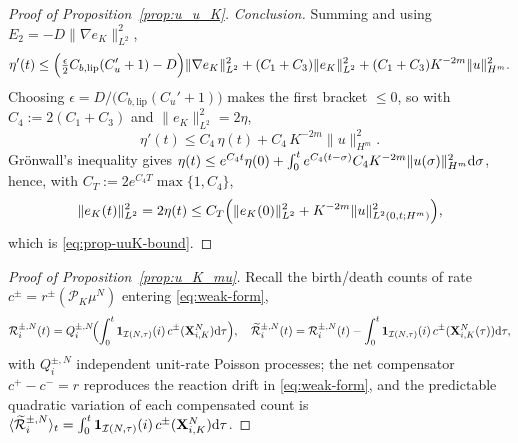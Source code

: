 \documentclass[a4paper,fleqn]{cas-sc}
\theoremstyle{definition}
\theoremstyle{remark}
\begin{document}
\begin{proof}[Proof of Proposition~\ref{prop:u_u_K}]
\emph{Conclusion.} Summing and using $E_2=-D\|\nabla e_K\|_{L^2}^2$,
\[
\eta'(t)\le\Bigl(\tfrac{\epsilon}{2}C_{b,\mathrm{lip}}(C_u'+1)-D\Bigr)\|\nabla e_K\|_{L^2}^2
+(C_1+C_3)\|e_K\|_{L^2}^2+(C_1+C_3)K^{-2m}\|u\|_{H^m}^2 .
\]
Choosing $\epsilon=D/\bigl(C_{b,\mathrm{lip}}(C_u'+1)\bigr)$ makes the first
bracket $\le0$, so with $C_4:=2(C_1+C_3)$ and $\|e_K\|_{L^2}^2=2\eta$,
\[
\eta'(t)\le C_4\,\eta(t)+C_4\,K^{-2m}\|u\|_{H^m}^2 .
\]
Gr\"onwall's inequality gives
$\eta(t)\le e^{C_4 t}\eta(0)+\int_0^t e^{C_4(t-\sigma)}C_4 K^{-2m}\|u(\sigma)\|_{H^m}^2\mathrm{d}\sigma$,
hence, with $C_T:=2e^{C_4 T}\max\{1,C_4\}$,
\[
\|e_K(t)\|_{L^2}^2=2\eta(t)\le C_T\Bigl(\|e_K(0)\|_{L^2}^2+K^{-2m}\|u\|_{L^2(0,t;H^m)}^2\Bigr),
\]
which is \eqref{eq:prop-uuK-bound}.
\end{proof}

\begin{proof}[Proof of Proposition~\ref{prop:u_K_mu}]
Recall the birth/death counts of rate $c^\pm=r^\pm(\mathcal P_K\mu^N)$ entering
\eqref{eq:weak-form},
\[
\mathcal R^{\pm,N}_i(t)=Q^{\pm,N}_i\!\Bigl(\int_0^t\mathbf 1_{\mathcal I(N,\tau)}(i)\,
c^\pm(\mathbf{X}^N_{i,K})\mathrm{d}\tau\Bigr),\quad
\widetilde{\mathcal R}^{\pm,N}_i(t)=\mathcal R^{\pm,N}_i(t)
-\int_0^t\mathbf 1_{\mathcal I(N,\tau)}(i)\,c^\pm(\mathbf{X}^N_{i,K}(\tau))\mathrm{d}\tau,
\]
with $Q^{\pm,N}_i$ independent unit-rate Poisson processes; the net compensator
$c^+-c^-=r$ reproduces the reaction drift in \eqref{eq:weak-form}, and the
predictable quadratic variation of each compensated count is
$\langle\widetilde{\mathcal R}^{\pm,N}_i\rangle_t=\int_0^t\mathbf 1_{\mathcal I(N,\tau)}(i)\,c^\pm(\mathbf{X}^N_{i,K})\mathrm{d}\tau$.


\end{proof}
\end{document}
